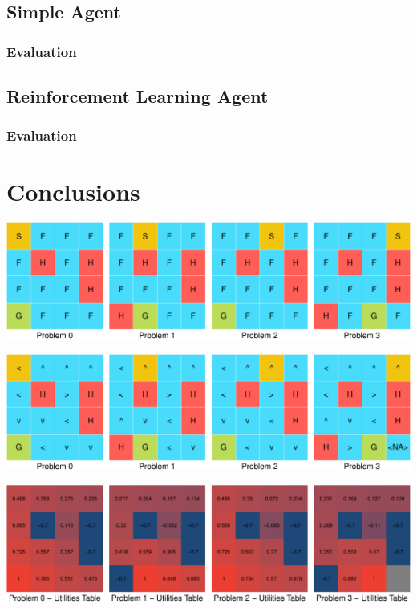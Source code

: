 \documentclass[11pt,]{article}
\begin{document}
\subsection{Simple Agent}\label{simple-agent}

\subsubsection{Evaluation}\label{evaluation-1}

\subsection{Reinforcement Learning
Agent}\label{reinforcement-learning-agent}

\subsubsection{Evaluation}\label{evaluation-2}

\section{Conclusions}\label{sec:con}

\begin{center}\includegraphics[width=0.9\linewidth]{project_files/figure-latex/unnamed-chunk-2-1} \end{center}

\begin{center}\includegraphics[width=0.9\linewidth]{project_files/figure-latex/unnamed-chunk-3-1} \end{center}

\begin{center}\includegraphics[width=0.9\linewidth]{project_files/figure-latex/unnamed-chunk-4-1} \end{center}
\end{document}
